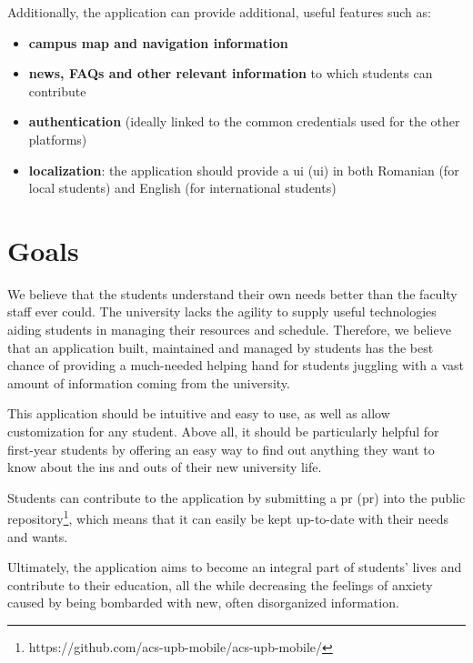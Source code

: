     Additionally, the application can provide additional, useful features such as:
    
    \begin{itemize}
        \setlength{\topsep}{0.5pt}
        \setlength{\itemsep}{0.5pt}
        \setlength{\parsep}{0.5pt}
        \item \textbf{campus map and navigation information}
        \item \textbf{news, FAQs and other relevant information} to which students can contribute
        \item \textbf{authentication} (ideally linked to the common credentials used for the other platforms)
        \item \textbf{localization}: the application should provide a \acrshort{ui} (\acrlong{ui}) in both Romanian (for local students) and English (for international students)
    \end{itemize}

\section{Goals} \label{1:goals}

    We believe that the students understand their own needs better than the faculty staff ever could. The university lacks the agility to supply useful technologies aiding students in managing their resources and schedule. Therefore, we believe that an application built, maintained and managed by students has the best chance of providing a much-needed helping hand for students juggling with a vast amount of information coming from the university.
    
    This application should be intuitive and easy to use, as well as allow customization for any student. Above all, it should be particularly helpful for first-year students by offering an easy way to find out anything they want to know about the ins and outs of their new university life.
    
    Students can contribute to the application by submitting a \acrshort{pr} (\acrlong{pr}) into the public repository\footnote{https://github.com/acs-upb-mobile/acs-upb-mobile/}, which means that it can easily be kept up-to-date with their needs and wants.
    
    Ultimately, the application aims to become an integral part of students' lives and contribute to their education, all the while decreasing the feelings of anxiety caused by being bombarded with new, often disorganized information.

